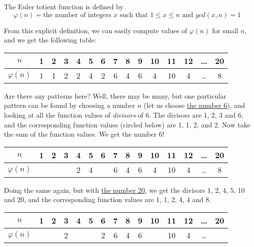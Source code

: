 \begin{example}
The Euler totient function is defined by
$$  \varphi(n) = \textrm{the number of integers $x$ such that $1 \leq x \leq n$ and $gcd(x, n) = 1$}  $$

From this explicit definition, we can easily compute values of $\varphi(n)$ for small $n$, and we get the following table:

\vspace{6pt}
\begin{tabular}{  | c || c | c | c | c | c | c | c | c | c | c | c | c | c | c |  }
  \hline			
  $n$ & 1 & 2 & 3 & 4 & 5 & 6 & 7 & 8 & 9 & 10 & 11 & 12 & \ldots & 20  \\
  \hline
  $\varphi(n) $ & 1 & 1 & 2 & 2 & 4 & 2 & 6 & 4 & 6 & 4 & 10 & 4 & \ldots & 8  \\
  \hline  
\end{tabular}
\vspace{6pt}

Are there any patterns here? Well, there may be many, but one particular pattern can be found by choosing a number $n$ (let us choose \underline{the number 6}), and looking at all the function values of \emph{divisors} of 6. The divisors are 1, 2, 3 and 6, and the corresponding function values (circled below) are 1, 1, 2, and 2. Now take the sum of the function values. We get the number 6!

\vspace{6pt}
\begin{tabular}{  | c || c | c | c | c | c | c | c | c | c | c | c | c | c | c |  }
  \hline			
  $n$ & \bf{1} & \bf{2} & \bf{3} & 4 & 5 & \bf{6} & 7 & 8 & 9 & 10 & 11 & 12 & \ldots & 20  \\
  \hline
  $\varphi(n) $ & \raisebox{.5pt}{\textcircled{\raisebox{-.9pt} {1}}} & \raisebox{.5pt}{\textcircled{\raisebox{-.9pt} {1}}} & \raisebox{.5pt}{\textcircled{\raisebox{-.9pt} {2}}} & 2 & 4 & \raisebox{.5pt}{\textcircled{\raisebox{-.9pt} {2}}} & 6 & 4 & 6 & 4 & 10 & 4 & \ldots & 8  \\
  \hline  
\end{tabular}
\vspace{6pt}

Doing the same again, but with \underline{the number 20}, we get the divisors 1, 2, 4, 5, 10 and 20, and the corresponding function values are 1, 1, 2, 4, 4 and 8. 

\vspace{6pt}
\begin{tabular}{  | c || c | c | c | c | c | c | c | c | c | c | c | c | c | c |  }
  \hline			
  $n$ & \bf{1} & \bf{2} & 3 & \bf{4} & \bf{5} & 6 & 7 & 8 & 9 & \bf{10} & 11 & 12 & \ldots & \bf{20}  \\
  \hline
  $\varphi(n) $ & \raisebox{.5pt}{\textcircled{\raisebox{-.9pt} {1}}} & \raisebox{.5pt}{\textcircled{\raisebox{-.9pt} {1}}} & 2 &  \raisebox{.5pt}{\textcircled{\raisebox{-.9pt} {2}}} &  \raisebox{.5pt}{\textcircled{\raisebox{-.9pt} {4}}} & 2 & 6 & 4 & 6 &  \raisebox{.5pt}{\textcircled{\raisebox{-.9pt} {4}}} & 10 & 4 & \ldots &  \raisebox{.5pt}{\textcircled{\raisebox{-.9pt} {8}}}  \\
  \hline  
\end{tabular}
\vspace{6pt}


\end{example}
